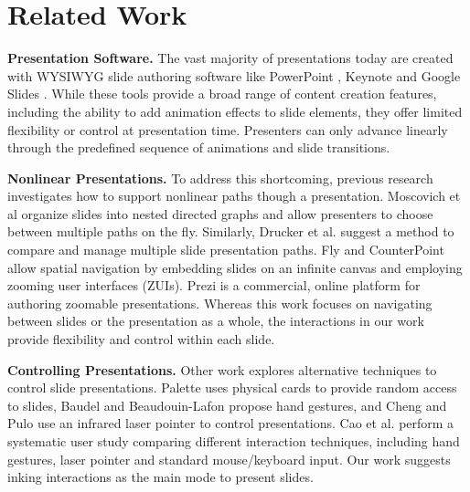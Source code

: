 \section{Related Work}

\textbf{Presentation Software.} The vast majority of presentations today are created with WYSIWYG slide authoring software like PowerPoint \cite{powerpoint2017}, Keynote \cite{keynote2017} and Google Slides \cite{googleslides2017}. 
%
While these tools provide a broad range of content creation features, including the ability to add animation effects to slide elements, 
they offer limited flexibility or control at presentation time. 
%
Presenters can only advance linearly through the predefined sequence of animations and slide transitions.

\textbf{Nonlinear Presentations.} To address this shortcoming, previous research investigates how to support nonlinear paths though a presentation. Moscovich et al \cite{moscovich2004customizable} organize slides into nested directed graphs and allow presenters to choose between multiple paths on the fly. Similarly, Drucker et al. \cite{drucker2006comparing} suggest a method to compare and manage multiple slide presentation paths. Fly \cite{lichtschlag2009fly} and CounterPoint \cite{good2002zoomable} allow spatial navigation by embedding slides on an infinite canvas and employing zooming user interfaces (ZUIs). Prezi \cite{prezi2017} is a commercial, online platform for authoring zoomable presentations. Whereas this work focuses on navigating between slides or the presentation as a whole, the interactions in our work provide flexibility and control within each slide.

\textbf{Controlling Presentations.} Other work explores alternative techniques to control slide presentations. Palette \cite{nelson1999palette} uses physical cards to provide random access to slides, Baudel and Beaudouin-Lafon \cite{baudel1993charade} propose hand gestures, and Cheng and Pulo \cite{cheng2003direct} use an infrared laser pointer to control presentations. Cao et al. \cite{cao2005evaluation} perform a systematic user study comparing different interaction techniques, including hand gestures, laser pointer and standard mouse/keyboard input. Our work suggests inking interactions as the main mode to present slides.

